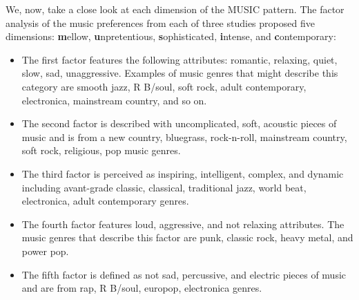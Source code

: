 We, now, take a close look at each dimension of the MUSIC pattern.
The factor analysis of the music preferences from each of three studies proposed five dimensions:
\textbf{m}ellow, \textbf{u}npretentious, \textbf{s}ophisticated, \textbf{i}ntense, and \textbf{c}ontemporary:
\begin{itemize}
\item The first factor features the following attributes: romantic, relaxing, quiet, slow, sad, unaggressive.
      Examples of music genres that might describe this category are smooth jazz, R B/soul, soft rock,
      adult contemporary, electronica, mainstream country, and so on.
\item The second factor is described with uncomplicated, soft, acoustic pieces of music and is from a new country,
      bluegrass, rock-n-roll, mainstream country, soft rock, religious, pop music genres.
\item The third factor is perceived as inspiring, intelligent, complex, and dynamic including
      avant-grade classic, classical, traditional jazz, world beat, electronica, adult contemporary genres.
\item The fourth factor features loud, aggressive, and not relaxing attributes.
      The music genres that describe this factor are punk, classic rock, heavy metal, and power pop.
\item The fifth factor is defined as not sad, percussive, and electric pieces of
      music and are from rap, R B/soul, europop, electronica genres.
\end{itemize}

